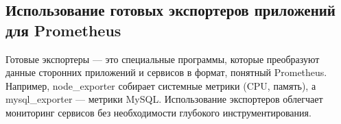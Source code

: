 \subsection{Использование готовых экспортеров приложений для Prometheus}

Готовые экспортеры --- это специальные программы,
которые преобразуют данные сторонних приложений и сервисов в формат,
понятный Prometheus.
Например, node\_exporter собирает системные метрики (CPU, память),
а mysql\_exporter --- метрики MySQL.
Использование экспортеров облегчает мониторинг сервисов
без необходимости глубокого инструментирования.


